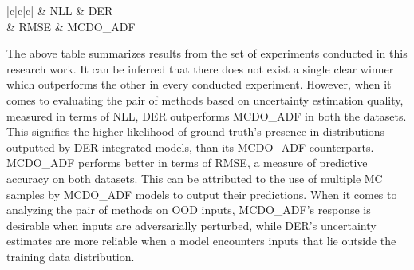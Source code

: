 \begin{table}[H]
\begin{tabular}{|c|c|c|}
		\hline
		 & NLL                                                                                                                        & DER                         \\ 
		& RMSE                                                                                                                       & MCDO\_ADF                   \\
		\hline
	\end{tabular}
\caption{Table of conducted experiments and their results}
\label{tab_eval_summary}
\end{table}
The above table summarizes results from the set of experiments conducted in this research work. It can be inferred that there does not exist a single clear winner which outperforms the other in every conducted experiment. However, when it comes to evaluating the pair of methods based on uncertainty estimation quality, measured in terms of NLL, DER outperforms MCDO\_ADF in both the datasets. This signifies the higher likelihood of ground truth's presence in distributions outputted by DER integrated models, than its MCDO\_ADF counterparts. MCDO\_ADF performs better in terms of RMSE, a measure of predictive accuracy on both datasets. This can be attributed to the use of multiple MC samples by MCDO\_ADF models to output their predictions. When it comes to analyzing the pair of methods on OOD inputs, MCDO\_ADF's response is desirable when inputs are adversarially perturbed, while DER's uncertainty estimates are more reliable when a model encounters inputs that lie outside the training data distribution. 


